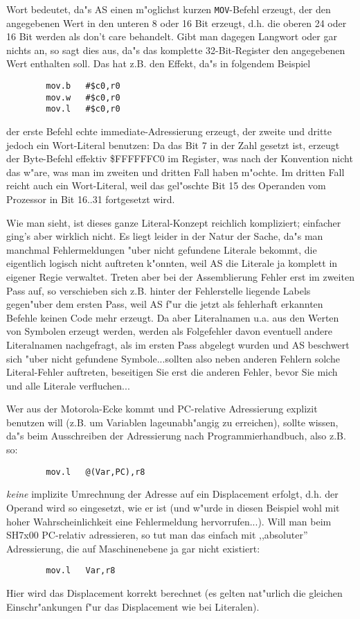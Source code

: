 \documentclass[12pt,a4paper,twoside]{report}
\newcommand{\tty}[1]{{\tt #1}}
\begin{document}
Wort bedeutet, da"s AS einen m"oglichst kurzen \tty{MOV}-Befehl erzeugt,
der den angegebenen Wert in den unteren 8 oder 16 Bit erzeugt, d.h.
die oberen 24 oder 16 Bit werden als don't care behandelt.  Gibt
man dagegen Langwort oder gar nichts an, so sagt dies aus, da"s
das komplette 32-Bit-Register den angegebenen Wert enthalten soll.
Das hat z.B. den Effekt, da"s in folgendem Beispiel
\begin{verbatim}
        mov.b   #$c0,r0
        mov.w   #$c0,r0
        mov.l   #$c0,r0
\end{verbatim}
der erste Befehl echte immediate-Adressierung erzeugt, der zweite und
dritte jedoch ein Wort-Literal benutzen: Da das Bit 7 in der Zahl gesetzt
ist, erzeugt der Byte-Befehl effektiv \$FFFFFFC0 im Register, was nach
der Konvention nicht das w"are, was man im zweiten und dritten Fall haben
m"ochte.  Im dritten Fall reicht auch ein Wort-Literal, weil das gel"oschte
Bit 15 des Operanden vom Prozessor in Bit 16..31 fortgesetzt wird.
\par
Wie man sieht, ist dieses ganze Literal-Konzept reichlich kompliziert;
einfacher ging's aber wirklich nicht.  Es liegt leider in der Natur
der Sache, da"s man manchmal Fehlermeldungen "uber nicht gefundene
Literale bekommt, die eigentlich logisch nicht auftreten k"onnten, weil
AS die Literale ja komplett in eigener Regie verwaltet.  Treten aber bei
der Assemblierung Fehler erst im zweiten Pass auf, so verschieben sich
z.B. hinter der Fehlerstelle liegende Labels gegen"uber dem ersten Pass,
weil AS f"ur die jetzt als fehlerhaft erkannten Befehle keinen Code mehr
erzeugt.  Da aber Literalnamen u.a. aus den Werten von Symbolen erzeugt
werden, werden als Folgefehler davon eventuell andere Literalnamen
nachgefragt, als im ersten Pass abgelegt wurden und AS beschwert sich
"uber nicht gefundene Symbole...sollten also neben anderen Fehlern solche
Literal-Fehler auftreten, beseitigen Sie erst die anderen Fehler, bevor
Sie mich und alle Literale verfluchen...
\par
Wer aus der Motorola-Ecke kommt und PC-relative Adressierung explizit
benutzen will (z.B. um Variablen lageunabh"angig zu erreichen), sollte
wissen, da"s beim Ausschreiben der Adressierung nach Programmierhandbuch,
also z.B. so:
\begin{verbatim}
        mov.l   @(Var,PC),r8
\end{verbatim}
{\it keine} implizite Umrechnung der Adresse auf ein Displacement erfolgt,
d.h. der Operand wird so eingesetzt, wie er ist (und w"urde in diesen
Beispiel wohl mit hoher Wahrscheinlichkeit eine Fehlermeldung
hervorrufen...).  Will man beim SH7x00 PC-relativ adressieren, so tut man
das einfach mit ,,absoluter'' Adressierung, die auf Maschinenebene ja
gar nicht existiert:
\begin{verbatim}
        mov.l   Var,r8
\end{verbatim}
Hier wird das Displacement korrekt berechnet (es gelten nat"urlich die
gleichen Einschr"ankungen f"ur das Displacement wie bei Literalen).
\end{document}
